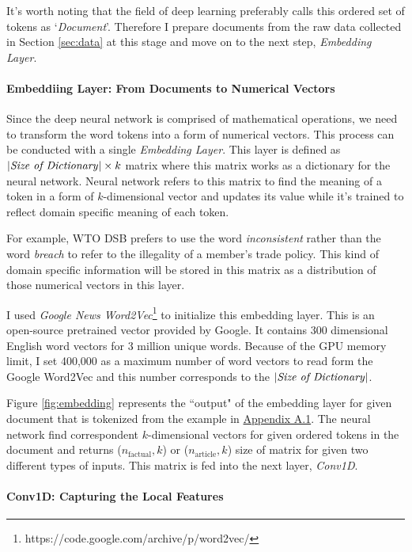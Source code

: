 \documentclass[12pt,letterpaper]{article}
\begin{document}
It's worth noting that the field of deep learning preferably calls this ordered set of tokens as `\textit{Document}'.
Therefore I prepare documents from the raw data collected in Section \ref{sec:data} at this stage and move on to the next step, \textit{Embedding Layer}.

\paragraph{Embeddiing Layer: From Documents to Numerical Vectors}

Since the deep neural network is comprised of mathematical operations,
we need to transform the word tokens into a form of numerical vectors.
This process can be conducted with a single \textit{Embedding Layer}. %
This layer is defined as $|\text{\textit{Size of Dictionary}}| \times k $ matrix where this matrix works as a dictionary for the neural network.
Neural network refers to this matrix to find the meaning of a token in a form of $k$-dimensional vector and updates its value while it's trained to
reflect domain specific meaning of each token.
 
For example, WTO DSB prefers to use the word \textit{inconsistent} rather than the word \textit{breach} to refer to the illegality of a member's trade policy.
This kind of domain specific information will be stored in this matrix as a distribution of those numerical vectors in this layer.
 
I used \textit{Google News Word2Vec}\footnote{https://code.google.com/archive/p/word2vec/} to initialize this embedding layer. This is an open-source pretrained vector provided by Google. It contains 300 dimensional English word vectors for 3 million unique words. Because of the GPU memory limit, I set 400,000 as a maximum number of word vectors to read form the Google Word2Vec and this number corresponds to the $|\text{\textit{Size of Dictionary}}|$.
 
Figure \ref{fig:embedding} represents the ``output" of the embedding layer for given document that is tokenized
from the example in \hyperref[sub:factual-aspect-example]{Appendix A.1}.
The neural network find correspondent $k$-dimensional vectors for given ordered tokens in the document and returns ($n_{\text{factual}}, k$) or ($n_{\text{article}}, k$) size of matrix for given two different types of inputs.
This matrix is fed into the next layer, \textit{Conv1D}.



\paragraph{Conv1D: Capturing the Local Features}
 
\end{document}
